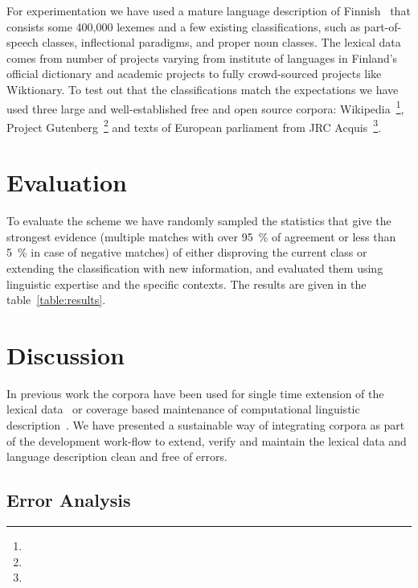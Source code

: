 \documentclass[a5paper]{article}
\begin{document}
For experimentation we have used a mature language description of
Finnish~\cite{pirinen2011modularisation} that consists some 400,000 lexemes and
a few existing classifications, such as part-of-speech classes, inflectional
paradigms, and proper noun classes. The lexical data comes from number of
projects varying from institute of languages in Finland's official dictionary
and academic projects to fully crowd-sourced projects like Wiktionary. To test
out that the classifications match the expectations we have used three large
and well-established free and open source corpora: Wikipedia~\footnote{},
Project Gutenberg~\footnote{} and texts of European parliament from JRC
Acquis~\footnote{}. 

\section{Evaluation}

To evaluate the scheme we have randomly sampled the statistics that give the
strongest evidence (multiple matches with over 95~\% of agreement or less than 
5~\% in case of negative matches) of either
disproving the current class or extending the classification with new
information, and evaluated them using linguistic expertise and the specific
contexts. The results are given in the table~\ref{table:results}.

\section{Discussion}

In previous work the corpora have been used for single time extension of the
lexical data~\cite{} or coverage based maintenance of computational linguistic
description~\cite{}. We have presented a sustainable way of integrating corpora
as part of the development work-flow to extend, verify and maintain the lexical
data and language description clean and free of errors.

\subsection{Error Analysis}
\end{document}
